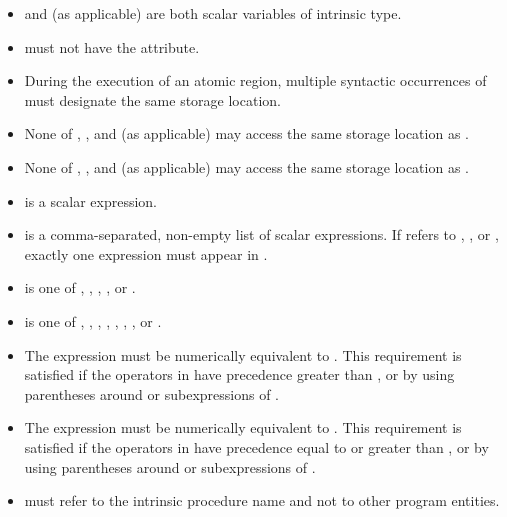 \begin{itemize}
\item {} and  (as applicable) are both scalar variables of intrinsic type.

\item {} must not have the  attribute.

\item During the execution of an atomic region, multiple syntactic occurrences of  must 
designate the same storage location.

\item None of , , and  (as applicable) may access the same storage location as 
. 

\item None of , , and  (as applicable) may access the same storage location as 
.

\item {} is a scalar expression.

\item {} is a comma-separated, non-empty list of scalar expressions. If 
 refers to , , or , exactly one expression 
must appear in .

\item {} is one of , , , , or .

\item {} is one of \code{+}, \code{*}, \code{-}, \code{/}, , , , or .

\item The expression  must be numerically equivalent to . 
This requirement is satisfied if the operators in  have precedence greater than 
, or by using parentheses around  or subexpressions of .

\item The expression  must be numerically equivalent to . This requirement is satisfied if the operators in  have precedence equal to or 
greater than , or by using parentheses around  or subexpressions of .

\item {} must refer to the intrinsic procedure name and not to other 
program entities.


\end{itemize}
